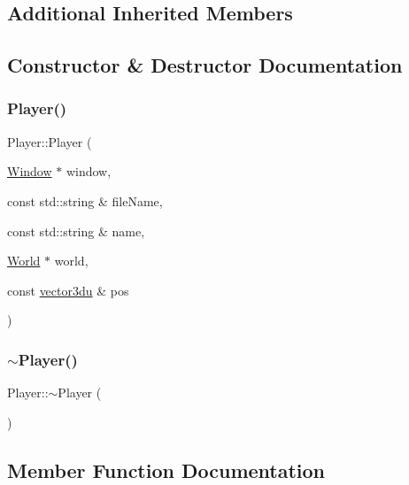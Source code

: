 \subsection*{Additional Inherited Members}


\subsection{Constructor \& Destructor Documentation}
\mbox{\label{class_player_a834edaa77749cec926a696368ad39cf0}} 
\subsubsection{\texorpdfstring{Player()}{Player()}}
{\footnotesize\ttfamily Player\+::\+Player (\begin{DoxyParamCaption}\item[{\mbox{\hyperlink{class_window}{Window}} $\ast$}]{window,  }\item[{const std\+::string \&}]{file\+Name,  }\item[{const std\+::string \&}]{name,  }\item[{\mbox{\hyperlink{class_world}{World}} $\ast$}]{world,  }\item[{const \mbox{\hyperlink{_utility_8hpp_ac675fa2b6c79d0be47ae76e5d0ce38a8}{vector3du}} \&}]{pos }\end{DoxyParamCaption})}

\mbox{\label{class_player_a749d2c00e1fe0f5c2746f7505a58c062}} 
\subsubsection{\texorpdfstring{$\sim$Player()}{~Player()}}
{\footnotesize\ttfamily Player\+::$\sim$\+Player (\begin{DoxyParamCaption}{ }\end{DoxyParamCaption})}



\subsection{Member Function Documentation}
\mbox{\label{class_player_a30ce504fcf084e2e48f87d1b7a408281}} 
